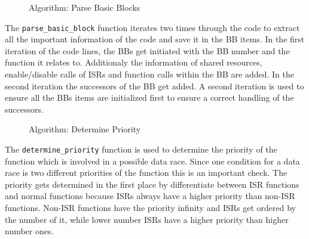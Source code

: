 \documentclass[
fancyheadings, %
%
%
]{stsreprt}
\begin{document}
{\begin{figure}[H]
{\begin{algorithm}[H]
	
	\;
\end{algorithm}

}
	\caption{Algorithm: Parse Basic Blocks}
\end{figure}
\vspace{1cm}
The \texttt{parse\_basic\_block} function iterates two times through the code to extract all the important information of the code and save it in the \ac{BB} items. In the first iteration of the code lines, the \acp{BB} get initiated with the \ac{BB} number and the function it relates to. Additionaly the information of shared resources, enable/disable calls of \acp{ISR} and function calls within the \ac{BB} are added.
In the second iteration the successors of the \ac{BB} get added. A second iteration is used to ensure all the \acp{BB} items are initialized first to ensure a correct handling of the successors.

\begin{figure}[H]
	\centering
	\caption{Algorithm: Determine Priority}
\end{figure} 

The \texttt{determine\_priority} function is used to determine the priority of the function which is involved in a possible data race. Since one condition for a data race is two different priorities of the function this is an important check. The priority gets determined in the first place by differentiate between \ac{ISR} functions and normal functions because \acp{ISR} always have a higher priority than non-\ac{ISR} functions. Non-\Ac{ISR} functions have the priority infinity and \acp{ISR} get ordered by the number of it, while lower number \acp{ISR} have a higher priority than higher number ones.

}
\end{document}

